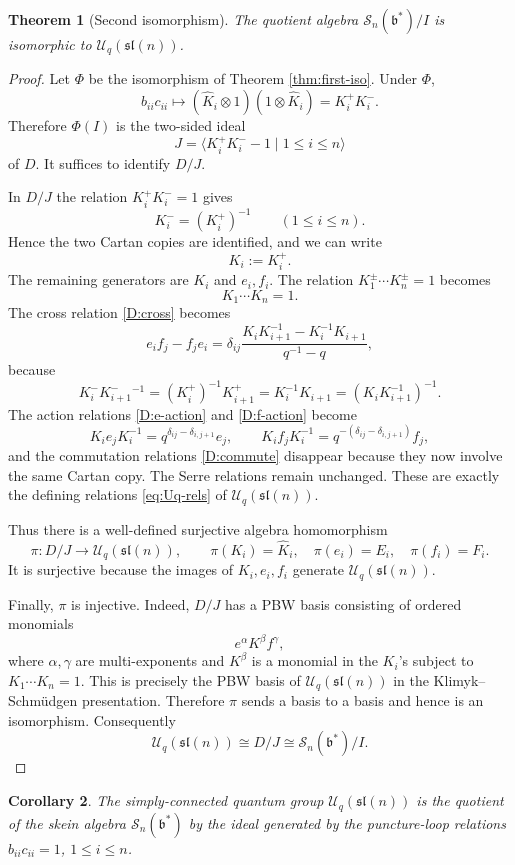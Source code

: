 \documentclass[11pt]{article}
\newcommand{\Uc}{\mathcal U}
\newcommand{\bcS}{\mathcal S}
\newcommand{\fb}{\mathfrak b}
\newcommand{\sl}{\mathfrak{sl}}
\newtheorem{theorem}{Theorem}
\newtheorem{corollary}[theorem]{Corollary}
\theoremstyle{definition}
\theoremstyle{remark}
\begin{document}
\begin{theorem}[Second isomorphism]\label{thm:second-iso}
The quotient algebra \(\bcS_n(\fb^*)/I\) is isomorphic to
\(\Uc_q(\sl(n))\).
\end{theorem}

\begin{proof}
Let \(\Phi\) be the isomorphism of Theorem \ref{thm:first-iso}.  Under
\(\Phi\),
\[
b_{ii}c_{ii}\longmapsto (\hat K_i\otimes 1)(1\otimes \hat K_i)
=K_i^+K_i^-.
\]
Therefore \(\Phi(I)\) is the two-sided ideal
\[
J=\langle K_i^+K_i^--1\mid 1\le i\le n\rangle
\]
of \(D\).  It suffices to identify \(D/J\).

In \(D/J\) the relation \(K_i^+K_i^-=1\) gives
\[
K_i^-=(K_i^+)^{-1}\qquad (1\le i\le n).
\]
Hence the two Cartan copies are identified, and we can write
\[
K_i:=K_i^+.
\]
The remaining generators are \(K_i\) and \(e_i,f_i\).  The relation
\(K_1^\pm\cdots K_n^\pm=1\) becomes
\[
K_1\cdots K_n=1.
\]
The cross relation \eqref{D:cross} becomes
\[
e_if_j-f_je_i
=\delta_{ij}\frac{K_iK_{i+1}^{-1}-K_i^{-1}K_{i+1}}{q^{-1}-q},
\]
because
\[
K_i^-K_{i+1}^-{}^{-1}
=(K_i^+)^{-1}K_{i+1}^+
=K_i^{-1}K_{i+1}
=(K_iK_{i+1}^{-1})^{-1}.
\]
The action relations \eqref{D:e-action} and \eqref{D:f-action} become
\[
K_i e_j K_i^{-1}=q^{\delta_{ij}-\delta_{i,j+1}}e_j,\qquad
K_i f_j K_i^{-1}=q^{-(\delta_{ij}-\delta_{i,j+1})}f_j,
\]
and the commutation relations \eqref{D:commute} disappear because they now
involve the same Cartan copy.  The Serre relations remain unchanged.  These
are exactly the defining relations \eqref{eq:Uq-rels} of
\(\Uc_q(\sl(n))\).

Thus there is a well-defined surjective algebra homomorphism
\[
\pi:D/J\longrightarrow \Uc_q(\sl(n)),\qquad
\pi(K_i)=\hat K_i,\quad \pi(e_i)=E_i,\quad \pi(f_i)=F_i .
\]
It is surjective because the images of \(K_i,e_i,f_i\) generate
\(\Uc_q(\sl(n))\).

Finally, \(\pi\) is injective.  Indeed, \(D/J\) has a PBW basis consisting of
ordered monomials
\[
e^\alpha K^\beta f^\gamma,
\]
where \(\alpha,\gamma\) are multi-exponents and \(K^\beta\) is a monomial in
the \(K_i\)'s subject to \(K_1\cdots K_n=1\).  This is precisely the PBW basis
of \(\Uc_q(\sl(n))\) in the Klimyk--Schm\"udgen presentation.  Therefore
\(\pi\) sends a basis to a basis and hence is an isomorphism.  Consequently
\[
\Uc_q(\sl(n))\cong D/J\cong \bcS_n(\fb^*)/I.
\]
\end{proof}

\begin{corollary}
The simply-connected quantum group \(\Uc_q(\sl(n))\) is the quotient of the
skein algebra \(\bcS_n(\fb^*)\) by the ideal generated by the puncture-loop
relations \(b_{ii}c_{ii}=1\), \(1\le i\le n\).
\end{corollary}
\end{document}
